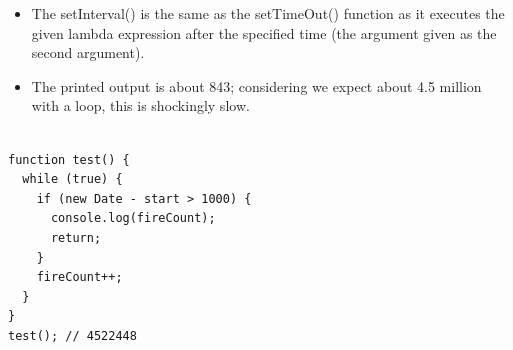 \begin{frame}[fragile]{}

\begin{itemize}
	\item The setInterval() is the same as the setTimeOut() function as it executes the given lambda expression after the specified time (the argument given as the second argument). 
	\item The printed output is about 843; considering we expect about 4.5 million with a loop, this is shockingly slow.  
\end{itemize}

\begin{Code}{}%
\begin{lstlisting}[firstnumber=1, label=glabels, xleftmargin=0pt, basicstyle=\scriptsize]% 

function test() {
  while (true) {
    if (new Date - start > 1000) {
      console.log(fireCount);
      return;
    }
    fireCount++;
  }
} 
test(); // 4522448
\end{lstlisting}%
\end{Code}%

\end{frame}